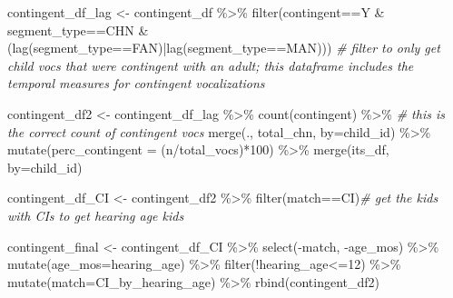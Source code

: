 \documentclass[
]{article}
\newenvironment{Shaded}{\begin{snugshade}}{\end{snugshade}}
\newcommand{\AttributeTok}[1]{\textcolor[rgb]{0.77,0.63,0.00}{#1}}
\newcommand{\CommentTok}[1]{\textcolor[rgb]{0.56,0.35,0.01}{\textit{#1}}}
\newcommand{\DecValTok}[1]{\textcolor[rgb]{0.00,0.00,0.81}{#1}}
\newcommand{\FunctionTok}[1]{\textcolor[rgb]{0.00,0.00,0.00}{#1}}
\newcommand{\NormalTok}[1]{#1}
\newcommand{\OtherTok}[1]{\textcolor[rgb]{0.56,0.35,0.01}{#1}}
\newcommand{\SpecialCharTok}[1]{\textcolor[rgb]{0.00,0.00,0.00}{#1}}
\newcommand{\StringTok}[1]{\textcolor[rgb]{0.31,0.60,0.02}{#1}}
\begin{document}
\begin{Shaded}
\begin{Highlighting}[]
\NormalTok{contingent\_df\_lag }\OtherTok{\textless{}{-}}\NormalTok{ contingent\_df }\SpecialCharTok{\%\textgreater{}\%}  
  \FunctionTok{filter}\NormalTok{(contingent}\SpecialCharTok{==}\StringTok{\textquotesingle{}Y\textquotesingle{}} \SpecialCharTok{\&}\NormalTok{ segment\_type}\SpecialCharTok{==}\StringTok{\textquotesingle{}CHN\textquotesingle{}} \SpecialCharTok{\&}\NormalTok{ (}\FunctionTok{lag}\NormalTok{(segment\_type}\SpecialCharTok{==}\StringTok{\textquotesingle{}FAN\textquotesingle{}}\NormalTok{)}\SpecialCharTok{|}\FunctionTok{lag}\NormalTok{(segment\_type}\SpecialCharTok{==}\StringTok{\textquotesingle{}MAN\textquotesingle{}}\NormalTok{))) }\CommentTok{\# filter to only get child vocs that were contingent with an adult; this dataframe includes the temporal measures for contingent vocalizations }


\NormalTok{contingent\_df2 }\OtherTok{\textless{}{-}}\NormalTok{ contingent\_df\_lag }\SpecialCharTok{\%\textgreater{}\%} 
  \FunctionTok{count}\NormalTok{(contingent) }\SpecialCharTok{\%\textgreater{}\%} \CommentTok{\# this is the correct count of contingent vocs }
  \FunctionTok{merge}\NormalTok{(., total\_chn, }\AttributeTok{by=}\StringTok{\textquotesingle{}child\_id\textquotesingle{}}\NormalTok{) }\SpecialCharTok{\%\textgreater{}\%}
  \FunctionTok{mutate}\NormalTok{(}\AttributeTok{perc\_contingent =}\NormalTok{ (n}\SpecialCharTok{/}\NormalTok{total\_vocs)}\SpecialCharTok{*}\DecValTok{100}\NormalTok{) }\SpecialCharTok{\%\textgreater{}\%}
  \FunctionTok{merge}\NormalTok{(its\_df, }\AttributeTok{by=}\StringTok{\textquotesingle{}child\_id\textquotesingle{}}\NormalTok{) }

\NormalTok{contingent\_df\_CI }\OtherTok{\textless{}{-}}\NormalTok{ contingent\_df2 }\SpecialCharTok{\%\textgreater{}\%} \FunctionTok{filter}\NormalTok{(match}\SpecialCharTok{==}\StringTok{\textquotesingle{}CI\textquotesingle{}}\NormalTok{)}\CommentTok{\# get the kids with CIs to get hearing age kids }

\NormalTok{contingent\_final }\OtherTok{\textless{}{-}}\NormalTok{ contingent\_df\_CI }\SpecialCharTok{\%\textgreater{}\%}
  \FunctionTok{select}\NormalTok{(}\SpecialCharTok{{-}}\NormalTok{match, }\SpecialCharTok{{-}}\NormalTok{age\_mos) }\SpecialCharTok{\%\textgreater{}\%}
  \FunctionTok{mutate}\NormalTok{(}\AttributeTok{age\_mos=}\NormalTok{hearing\_age) }\SpecialCharTok{\%\textgreater{}\%}
  \FunctionTok{filter}\NormalTok{(}\SpecialCharTok{!}\NormalTok{hearing\_age}\SpecialCharTok{\textless{}=}\DecValTok{12}\NormalTok{) }\SpecialCharTok{\%\textgreater{}\%}
  \FunctionTok{mutate}\NormalTok{(}\AttributeTok{match=}\StringTok{\textquotesingle{}CI\_by\_hearing\_age\textquotesingle{}}\NormalTok{) }\SpecialCharTok{\%\textgreater{}\%}
  \FunctionTok{rbind}\NormalTok{(contingent\_df2)}
\end{Highlighting}
\end{Shaded}
\end{document}
